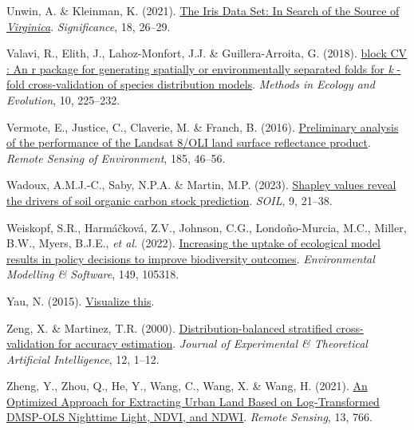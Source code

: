 \documentclass[
  letterpaper,
]{scrbook}
\newlength{\cslhangindent}
\newenvironment{CSLReferences}[2] %
 {\begin{list}{}{%
  \setlength{\itemindent}{0pt}
  \setlength{\leftmargin}{0pt}
  \setlength{\parsep}{0pt}
  \ifodd #1
   \setlength{\leftmargin}{\cslhangindent}
   \setlength{\itemindent}{-1\cslhangindent}
  \fi
  \setlength{\itemsep}{#2\baselineskip}}}
 {\end{list}}
\begin{document}
\begin{CSLReferences}{1}{0}
Unwin, A. \& Kleinman, K. (2021).
\href{https://doi.org/10.1111/1740-9713.01589}{The Iris Data Set: In
Search of the Source of {\emph{Virginica}}}. \emph{Significance}, 18,
26--29.

Valavi, R., Elith, J., Lahoz-Monfort, J.J. \& Guillera-Arroita, G.
(2018). \href{https://doi.org/10.1111/2041-210x.13107}{block CV : An r
package for generating spatially or environmentally separated folds for
{\emph{k}} {-}fold cross{-}validation of species distribution models}.
\emph{Methods in Ecology and Evolution}, 10, 225--232.

Vermote, E., Justice, C., Claverie, M. \& Franch, B. (2016).
\href{https://doi.org/10.1016/j.rse.2016.04.008}{Preliminary analysis of
the performance of the Landsat 8/OLI land surface reflectance product}.
\emph{Remote Sensing of Environment}, 185, 46--56.

Wadoux, A.M.J.-C., Saby, N.P.A. \& Martin, M.P. (2023).
\href{https://doi.org/10.5194/soil-9-21-2023}{Shapley values reveal the
drivers of soil organic carbon stock prediction}. \emph{SOIL}, 9,
21--38.

Weiskopf, S.R., Harmáčková, Z.V., Johnson, C.G., Londoño-Murcia, M.C.,
Miller, B.W., Myers, B.J.E., \emph{et al.} (2022).
\href{https://doi.org/10.1016/j.envsoft.2022.105318}{Increasing the
uptake of ecological model results in policy decisions to improve
biodiversity outcomes}. \emph{Environmental Modelling \& Software}, 149,
105318.

Yau, N. (2015). \href{https://doi.org/10.1002/9781118722213}{Visualize
this}.

Zeng, X. \& Martinez, T.R. (2000).
\href{https://doi.org/10.1080/095281300146272}{Distribution-balanced
stratified cross-validation for accuracy estimation}. \emph{Journal of
Experimental \& Theoretical Artificial Intelligence}, 12, 1--12.

Zheng, Y., Zhou, Q., He, Y., Wang, C., Wang, X. \& Wang, H. (2021).
\href{https://doi.org/10.3390/rs13040766}{An Optimized Approach for
Extracting Urban Land Based on Log-Transformed DMSP-OLS Nighttime Light,
NDVI, and NDWI}. \emph{Remote Sensing}, 13, 766.

\end{CSLReferences}


\backmatter
\end{document}
